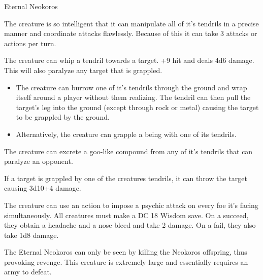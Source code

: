 \begin{monsterbox}{Eternal Neokoros}
	\begin{monsteraction}
		The creature is so intelligent that it can manipulate all of it's tendrils in a precise manner and coordinate attacks flawlessly. Because of this it can take 3 attacks or actions per turn.
	\end{monsteraction}
	\begin{monsteraction}
		The creature can whip a tendril towards a target. +9 hit and deals 4d6 damage. This will also paralyze any target that is grappled.
	\end{monsteraction}
	\begin{monsteraction}
		\begin{itemize}
			\item The creature can burrow one of it's tendrils through the ground and wrap itself around a player without them realizing. The tendril can then pull the target's leg into the ground (except through rock or metal) causing the target to be grappled by the ground.
			\item Alternatively, the creature can grapple a being with one of its tendrils.
		\end{itemize}
	\end{monsteraction}
	\begin{monsteraction}
		The creature can excrete a goo-like compound from any of it's tendrils that can paralyze an opponent. 
	\end{monsteraction}
	\begin{monsteraction}
		If a target is grappled by one of the creatures tendrils, it can throw the target causing 3d10+4 damage.
	\end{monsteraction}
	\begin{monsteraction}
		The creature can use an action to impose a psychic attack on every foe it's facing simultaneously. All creatures must make a DC 18 Wisdom save. On a succeed, they obtain a headache and a nose bleed and take 2 damage. On a fail, they also take 1d8 damage.
	\end{monsteraction}
	
	\details[%
	languages = {All},
	challenge = 20
	]
	\dndline%
	The Eternal Neokoros can only be seen by killing the Neokoros offspring, thus provoking revenge. This creature is extremely large and essentially requires an army to defeat.	
		

\end{monsterbox}
